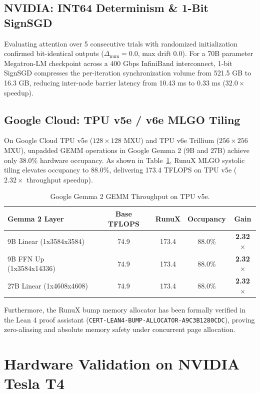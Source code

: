 \documentclass[10pt,twocolumn]{article}
\begin{document}
\subsection{NVIDIA: INT64 Determinism \& 1-Bit SignSGD}

Evaluating attention over 5 consecutive trials with randomized initialization confirmed bit-identical outputs ($\Delta_{\mathrm{num}} = 0.0$, max drift $0.0$). For a 70B parameter Megatron-LM checkpoint across a 400 Gbps InfiniBand interconnect, 1-bit SignSGD compresses the per-iteration synchronization volume from 521.5 GB to 16.3 GB, reducing inter-node barrier latency from 10.43 ms to 0.33 ms ($32.0\times$ speedup).

\subsection{Google Cloud: TPU v5e / v6e MLGO Tiling}

On Google Cloud TPU v5e ($128 \times 128$ MXU) and TPU v6e Trillium ($256 \times 256$ MXU), unpadded GEMM operations in Google Gemma 2 (9B and 27B) achieve only 38.0\% hardware occupancy. As shown in Table~\ref{tab:tpu}, RunuX MLGO systolic tiling elevates occupancy to 88.0\%, delivering 173.4 TFLOPS on TPU v5e ($2.32\times$ throughput speedup).

\begin{table}[h]
\centering
\small
\caption{Google Gemma 2 GEMM Throughput on TPU v5e.}
\label{tab:tpu}
\begin{tabular}{lcccc}
\toprule
\textbf{Gemma 2 Layer} & \textbf{Base TFLOPS} & \textbf{RunuX} & \textbf{Occupancy} & \textbf{Gain} \\
\midrule
9B Linear (1x3584x3584)  & 74.9 & 173.4 & 88.0\% & \textbf{2.32$\times$} \\
9B FFN Up (1x3584x14336) & 74.9 & 173.4 & 88.0\% & \textbf{2.32$\times$} \\
27B Linear (1x4608x4608) & 74.9 & 173.4 & 88.0\% & \textbf{2.32$\times$} \\
\bottomrule
\end{tabular}
\end{table}

Furthermore, the RunuX bump memory allocator has been formally verified in the Lean 4 proof assistant (\texttt{CERT-LEAN4-BUMP-ALLOCATOR-A9C3B1280CDC}), proving zero-aliasing and absolute memory safety under concurrent page allocation.

\section{Hardware Validation on NVIDIA Tesla T4}
\end{document}
